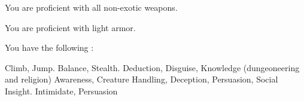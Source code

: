       You are proficient with all non-exotic weapons.

      You are proficient with light armor.

      You have the following :
      \begin{raggeditemize}
         Climb, Jump.
         Balance, Stealth.
         Deduction, Disguise, Knowledge (dungeoneering and religion)
         Awareness, Creature Handling, Deception, Persuasion, Social Insight.
         Intimidate, Persuasion
      \end{raggeditemize}
